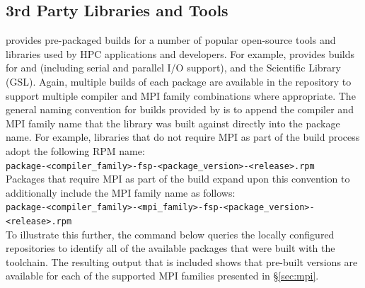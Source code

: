 \documentclass[letterpaper]{article}
\begin{document}


\subsection{3rd Party Libraries and Tools} \label{sec:3rdparty}

\FSP{} provides pre-packaged builds for a number of popular open-source
tools and libraries used by HPC applications and developers. For
example, \FSP{} provides builds for \FFTW{} and \hdffive{} (including serial and parallel
I/O support), and the \GNU{} Scientific Library (GSL). Again, multiple builds of
each package are available in the \FSP{} repository to support multiple compiler
and MPI family combinations where appropriate. The general naming convention
for builds provided by \FSP{} is to append the compiler and MPI family name that
the library was built against directly into the package name. For example,
libraries that do not require MPI as part of the build process adopt the
following RPM name: \\

\noindent
\texttt{package-<compiler\_family>-fsp-<package\_version>-<release>.rpm} \\

\noindent Packages that require MPI as part of the build expand upon this convention to
additionally include the MPI family name as follows: \\

\noindent
\texttt{package-<compiler\_family>-<mpi\_family>-fsp-<package\_version>-<release>.rpm} \\

To illustrate this further, the command below queries the locally configured
repositories to identify all of the available \FFTW{} packages that were built
with the \GNU{} toolchain. The resulting output that is included shows that
pre-built versions are available for each of the supported MPI families
presented in \S\ref{sec:mpi}.
\end{document}
